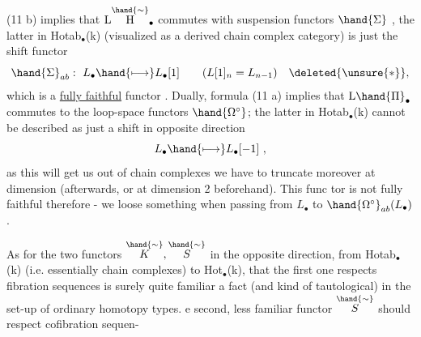  (11 b) implies that $\mathrm{L}\overset{\hand{\sim}}{\mathrm{H}}_{\bullet}$ commutes with suspension functors $\hand{\Sigma}$ ,
the latter in Hotab$_{\bullet}$(k) (visualized as a derived chain complex category)
is just the shift functor
\[ \hand{\Sigma}_{ab} : \ L_{\bullet} \hand{\longmapsto} L_{\bullet}[1] \qquad ( L[1]_{n} = L_{n-1}) \quad \deleted{\unsure{\ast}} , \]
which is a \uline{fully faithful} functor . Dually, formula (11 a) implies
that $\mathrm{L}\hand{\Pi}_{\bullet}$ commutes to the loop-space functors $\hand{\Omega^{\circ}}$; the latter in
Hotab$_{\bullet}$(k) cannot be described as just a shift in opposite direction
\[ L_{\bullet} \hand{\longmapsto} L_{\bullet}[-1] \ , \]
as this will get us out of  chain complexes we have to truncate moreover
at dimension  (afterwards, or at dimension  2 beforehand). This func%
tor is not fully faithful therefore - we loose something when passing
from $L_{\bullet}$ to $\hand{\Omega^{\circ}}_{ab}(L_{\bullet})$.

As for the two functors $\overset{\hand{\sim}}{K},\overset{\hand{\sim}}{S}$  in the opposite direction, from
Hotab$_{\bullet}$(k) (i.e. essentially chain complexes) to Hot$_{\bullet}$(k), that the
first one respects fibration sequences is surely quite familiar a fact
(and kind of tautological) in the set-up of ordinary homotopy types. 
e second, less familiar functor $\overset{\hand{\sim}}{S}$ should respect cofibration sequen-%


